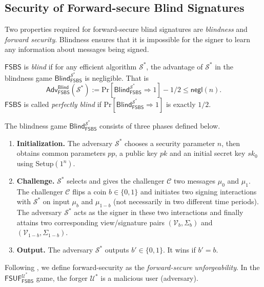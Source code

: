 \documentclass[runningheads]{llncs}
\def\Pr{\mathrm{Pr}}
\def\Adv{\mathsf{Adv}}
\begin{document}
\subsection{Security of Forward-secure Blind Signatures} \label{sfs}
Two properties required for forward-secure blind signatures
are \textit{blindness} and  \textit{forward security}. 
Blindness ensures that it is impossible for the signer to learn 
any information about messages being signed. 

\begin{definition}[Blindness] \label{bli}
$\mathsf{FSBS}$ is \textit{blind} if for any efficient algorithm  $\mathcal{S}^*$,
the advantage of $\mathcal{S}^*$ in the blindness game $\mathsf{Blind}_{\mathsf{FSBS}}^{\mathcal{S}^*}$ is negligible. 
That is  
\[
	\Adv^{\mathsf{Blind}}_{\mathsf{FSBS}}(\mathcal{S}^*):=\Pr[\mathsf{Blind}_{\mathsf{FSBS}}^{\mathcal{S}^*}
	\Rightarrow 1]-1/2 \leq \mathsf{negl}(n).
\]
$\mathsf{FSBS}$ is called \textit{perfectly blind} if $\Pr[\mathsf{Blind}_{\mathsf{FSBS}}^{\mathcal{S}^*}\Rightarrow 1]$ is exactly $1/2$. 
\end{definition}
%
\noindent
The blindness game $\textsf{Blind}_{\textsf{FSBS}}^{\mathcal{S}^*}$ consists of three phases defined below.

\begin{enumerate}
\item  \textbf{Initialization.} The adversary $\mathcal{S}^*$ chooses a security parameter $n$, 
	then obtains common parameters $pp$, a public key $pk$ and an initial secret key $sk_0$ using \textsf{Setup}$(1^{n})$. 
\item \textbf{Challenge.} $\mathcal{S}^*$ selects and gives  the challenger $\mathcal{C}$ two messages $\mu_0$ and  $\mu_1$. The challenger $\mathcal{C}$ flips a coin $b \in \{0, 1\}$ and initiates two signing interactions with  $\mathcal{S}^*$ on input $\mu_b$ and $\mu_{1-b}$ (not necessarily in two different time periods). The adversary $\mathcal{S}^*$ acts as the signer in these two interactions and finally attains two corresponding view/signature pairs $(\mathcal{V}_b,\Sigma_b)$ and $(\mathcal{V}_{1-b},\Sigma_{1-b})$.
	\item \textbf{Output.} The adversary $\mathcal{S}^*$ outputs $b' \in \{0,1\}$. It wins if $b'=b$.
	
\end{enumerate}

\noindent
Following \cite{DCK03}, we define forward-security 
as the \textit{forward-secure unforgeability}.  
In the $\textsf{FSUF}_{\textsf{FSBS}}^{\mathcal{U}^*}$ game, 
the forger $\mathcal{U}^*$ is a malicious user (adversary).
 
\end{document}
